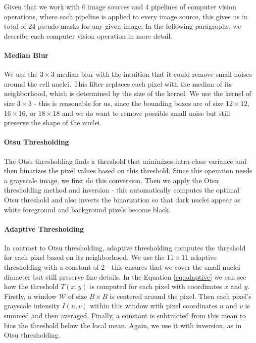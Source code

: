 Given that we work with 6 image sources and 4 pipelines of computer vision operations, where each pipeline is applied to every image source, this gives us in total of 24 pseudo-masks for any given image. In the following paragraphs, we describe each computer vision operation in more detail.

\paragraph{Median Blur}
We use the $3\!\times\!3$ median blur with the intuition that it could remove small noises around the cell nuclei. This filter replaces each pixel with the median of its neighborhood, which is determined by the size of the kernel. We use the kernel of size $3\!\times\!3$ - this is reasonable for us, since the bounding boxes are of size $12\!\times\!12$, $16\!\times\!16$, or $18\!\times\!18$ and we do want to remove possible small noise but still preserve the shape of the nuclei.

\paragraph{Otsu Thresholding}
The Otsu thresholding finds a threshold that minimizes intra-class variance and then binarizes the pixel values based on this threshold. Since this operation needs a grayscale image, we first do this conversion. Then we apply the Otsu thresholding method and inversion - this automatically computes the optimal Otsu threshold and also inverts the binarization so that dark nuclei appear as white foreground and background pixels become black.

\paragraph{Adaptive Thresholding}
In contrast to Otsu thresholding, adaptive thresholding computes the threshold for each pixel based on its neighborhood. We use the $11\!\times\!11$ adaptive thresholding with a constant of 2 - this ensures that we cover the small nuclei diameter but still preserve fine details. In the Equation \ref{eq:adaptive} we can see how the threshold $T(x,y)$ is computed for each pixel with coordinates $x$ and $y$. Firstly, a window $\mathcal{W}$ of size $B\!\times\! B$ is centered around the pixel. Then each pixel's grayscale intensity $I(u,v)$ within this window with pixel coordinates $u$ and $v$ is summed and then averaged. Finally, a constant is subtracted from this mean to bias the threshold below the local mean. Again, we use it with inversion, as in Otsu thresholding.


